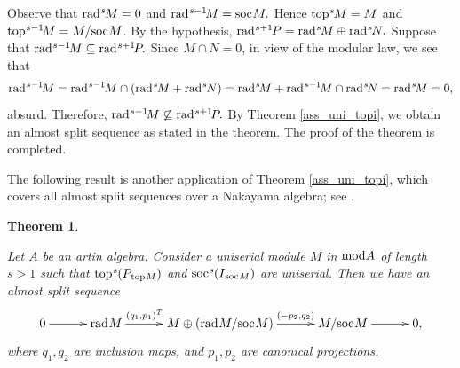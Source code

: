 \documentclass[10pt]{amsart}
\newtheorem{Theo}{Theorem}[subsection]
\theoremstyle{definition}
\newcommand{\mmod}{{\rm mod}}
\newcommand{\rad}{{\rm rad}\hspace{.5pt}}
\newcommand{\soc}{{\rm soc}\hspace{.5pt}}
\newcommand{\ntop}{{\rm top}\hspace{.5pt}}
\begin{document}
 Observe that $\rad^s\hspace{-1pt}M=0$ and $\rad^{s-1}\hspace{-1.5pt}M=\soc M.$ Hence $\ntop^s\hspace{-1pt}M=M$ and $\ntop^{s-1}\hspace{-1.5pt}M=M/\soc M$. By the hypothesis, $\rad^{s+1}\hspace{-1pt}P=\rad^{s}\hspace{-1pt}M \oplus \rad^{s}\hspace{-1pt}N.$ Suppose that $\rad^{s-1}\hspace{-1.5pt}M\subseteq \rad^{s+1}\hspace{-1.5pt}P.$ Since $M\cap N=0$, in view of the modular law, we see that \vspace{-3pt} $$\rad^{s-1}\hspace{-1.5pt}M = \rad^{s-1}\hspace{-1pt}M\cap (\rad^{s}\hspace{-1pt}M+ \rad^{s}\hspace{-1pt}N)=\rad^{s}\hspace{-1.5pt}M + \rad^{s-1}\hspace{-1.5pt} M \cap \rad^{s}\hspace{-1.5pt}N=\rad^{s}\hspace{-1.5pt}M=0, \vspace{-3.5pt}$$ absurd. Therefore, $\rad^{s-1}\hspace{-1.5pt}M\not\subseteq \rad^{s+1}\hspace{-1.5pt}P.$ By Theorem \ref{ass_uni_topi}, we obtain an almost split sequence as stated in the theorem. The proof of the theorem is completed.

\smallskip

The following result is another application of Theorem \ref{ass_uni_topi}, which covers all almost split sequences over a Nakayama algebra; see \cite[p.197]{ARS}.

\begin{Theo}\label{ass_N_alg}

Let $A$ be an artin algebra. Consider a uniserial module $M$ in $\mmod A$ of length $s >1$ such that $\ntop^s\hspace{-.5pt}(P_{\hspace{.5pt}\ntop M})$ and $\soc^s\hspace{-.5pt}(I_{\hspace{.5pt}\soc M})$ are uniserial. Then we have an almost split sequence \vspace{-6pt}
$$\xymatrixcolsep{30pt}\xymatrix{
0\ar[r] & \rad M \ar[r]^-{(q_1, p_1)^T} & M \oplus (\rad M/\soc M) \ar[r]^-{(-p_2, q_2)} & M/\soc M \ar[r] & 0,}
\vspace{-6.5pt}$$ where $q_1, q_2$ are inclusion maps, and $p_1, p_2$ are canonical projections. 

\end{Theo}
\end{document}
